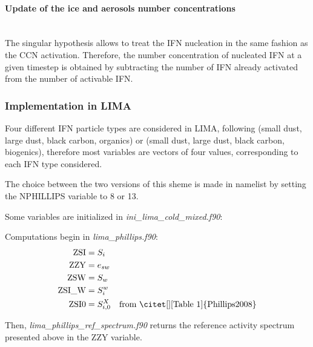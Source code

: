 \paragraph{Update of the ice and aerosols number concentrations}
~\\
The singular hypothesis allows to treat the IFN nucleation in the same fashion as the CCN activation. Therefore, the number concentration of nucleated IFN at a given timestep is obtained by subtracting the number of IFN already activated from the number of activable IFN.

\subsubsection{Implementation in LIMA}

Four different IFN particle types are considered in LIMA, following \citet{Phillips2008} (small dust, large dust, black carbon, organics) or \citet{Phillips2013} (small dust, large dust, black carbon, biogenics), therefore most variables are vectors of four values, corresponding to each IFN type considered.

The choice between the two versions of this sheme is made in namelist by setting the NPHILLIPS variable to 8 or 13.

Some variables are initialized in \emph{ini\_lima\_cold\_mixed.f90}:

Computations begin in \emph{lima\_phillips.f90}:
\begin{align}
 \mathrm{ZSI} &= S_i \\
 \mathrm{ZZY} &= e_{sw} \\
 \mathrm{ZSW} &= S_w \\
 \mathrm{ZSI\_W} &=  S_i^w \\
 \mathrm{ZSI0} &= S_{i,0}^X \quad \text{from \citet[][Table 1]{Phillips2008}} 
\end{align}

Then, \emph{lima\_phillips\_ref\_spectrum.f90} returns the reference activity spectrum presented above in the ZZY variable.

